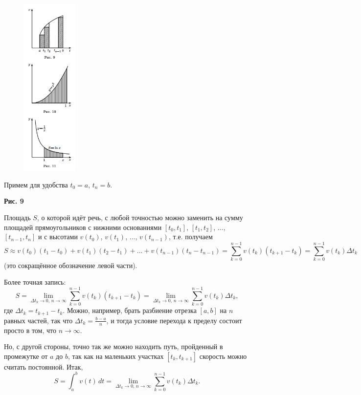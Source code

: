 \documentclass{article}
\begin{document}
\begin{figure}
  \centering
  \includegraphics[width=0.25\textwidth]{4_pictures.png}
\end{figure}

Примем для удобства \( t_0 = a \), \( t_n = b \).

\begin{center}
    \textbf{Рис. 9}
\end{center}

Площадь \( S \), о которой идёт речь, с любой точностью можно заменить на сумму площадей прямоугольников с нижними основаниями \([t_0, t_1]\), \([t_1, t_2]\), ..., \([t_{n-1}, t_n]\) и с высотами \( v(t_0) \), \( v(t_1) \), ..., \( v(t_{n-1}) \), т.е. получаем
\[
S \approx v(t_0)(t_1 - t_0) + v(t_1)(t_2 - t_1) + \dots + v(t_{n-1})(t_n - t_{n-1}) = \sum_{k=0}^{n-1} v(t_k)(t_{k+1} - t_k) = \sum_{k=0}^{n-1} v(t_k) \Delta t_k
\]
(это сокращённое обозначение левой части).

Более точная запись:
\[
S = \lim_{\Delta t_k \to 0, \, n \to \infty} \sum_{k=0}^{n-1} v(t_k)(t_{k+1} - t_k) = \lim_{\Delta t_k \to 0, \, n \to \infty} \sum_{k=0}^{n-1} v(t_k) \Delta t_k,
\]
где \( \Delta t_k = t_{k+1} - t_k \). Можно, например, брать разбиение отрезка \([a, b]\) на \( n \) равных частей, так что \( \Delta t_k = \frac{b-a}{n} \), и тогда условие перехода к пределу состоит просто в том, что \( n \to \infty \).

Но, с другой стороны, точно так же можно находить путь, пройденный в промежутке от \( a \) до \( b \), так как на маленьких участках \([t_k, t_{k+1}]\) скорость можно считать постоянной. Итак,
\[
S = \int_{a}^{b} v(t) \, dt = \lim_{\Delta t_k \to 0, \, n \to \infty} \sum_{k=0}^{n-1} v(t_k) \Delta t_k.
\]
\end{document}
